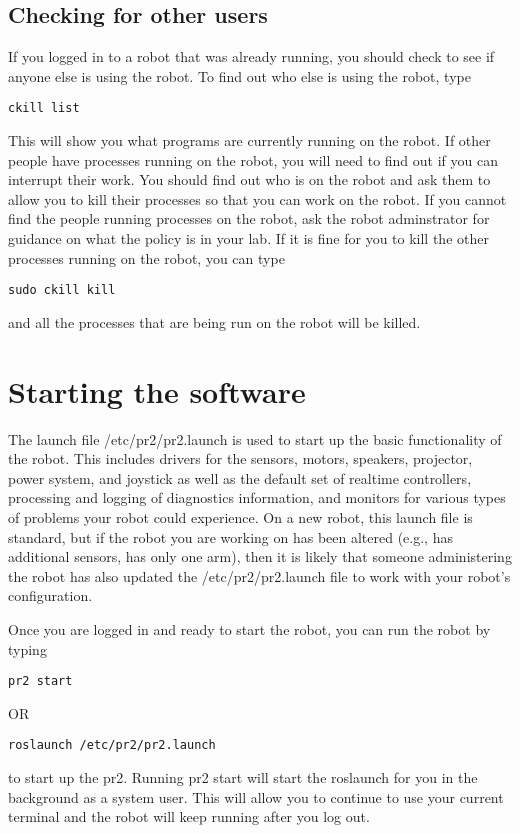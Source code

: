 \subsection{Checking for other users}
If you logged in to a robot that was already running, you should check to see if anyone else is using the robot.  To find out who else is using the robot, type
\begin{verbatim}
ckill list
\end{verbatim}
This will show you what programs are currently running on the robot.  If other people have processes running on the robot, you will need to find out if you can interrupt their work. You should find out who is on the robot and ask them to allow you to kill their processes so that you can work on the robot.  If you cannot find the people running processes on the robot, ask the robot adminstrator for guidance on what the policy is in your lab. If it is fine for you to kill the other processes running on the robot, you can type
\begin{verbatim}
sudo ckill kill
\end{verbatim}
and all the processes that are being run on the robot will be killed.
\section{Starting the software}
The launch file /etc/pr2/pr2.launch is used to start up the basic functionality of the robot.  This includes drivers for the sensors, motors, speakers, projector, power system, and joystick as well as the default set of realtime controllers, processing and logging of diagnostics information, and monitors for various types of problems your robot could experience.  On a new robot, this launch file is standard, but if the robot you are working on has been altered (e.g., has additional sensors, has only one arm), then it is likely that someone administering the robot has also updated the /etc/pr2/pr2.launch file to work with your robot's configuration.

Once you are logged in and ready to start the robot, you can run the robot by typing
\begin{verbatim}
pr2 start
\end{verbatim}
OR
\begin{verbatim}
roslaunch /etc/pr2/pr2.launch
\end{verbatim}
to start up the pr2.  Running pr2 start will start the roslaunch for you in the background as a system user. This will allow you to continue to use your current terminal and the robot will keep running after you log out.  

